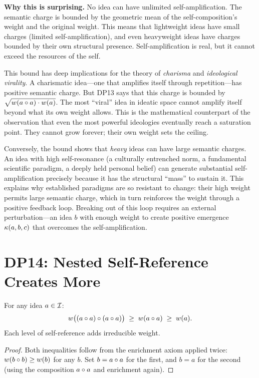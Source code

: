 \begin{surprisebox}
\textbf{Why this is surprising.} No idea can have unlimited
self-amplification. The semantic charge is bounded by the geometric mean
of the self-composition's weight and the original weight. This means
that lightweight ideas have small charges (limited self-amplification),
and even heavyweight ideas have charges bounded by their own structural
presence. Self-amplification is real, but it cannot exceed the resources
of the self.
\end{surprisebox}

This bound has deep implications for the theory of \emph{charisma} and
\emph{ideological virality}. A charismatic idea---one that amplifies
itself through repetition---has positive semantic charge. But DP13 says
that this charge is bounded by $\sqrt{w(a \circ a) \cdot w(a)}$.
The most ``viral'' idea in ideatic space cannot amplify itself beyond
what its own weight allows. This is the mathematical counterpart of
the observation that even the most powerful ideologies eventually
reach a saturation point. They cannot grow forever; their own weight
sets the ceiling.

Conversely, the bound shows that \emph{heavy} ideas can have large
semantic charges. An idea with high self-resonance (a culturally
entrenched norm, a fundamental scientific paradigm, a deeply held
personal belief) can generate substantial self-amplification precisely
because it has the structural ``mass'' to sustain it. This explains why
established paradigms are so resistant to change: their high weight
permits large semantic charge, which in turn reinforces the weight
through a positive feedback loop. Breaking out of this loop requires an
external perturbation---an idea $b$ with enough weight to create
positive emergence $\kappa(a, b, c)$ that overcomes the
self-amplification.

\section{DP14: Nested Self-Reference Creates More}

\begin{theorem}
\label{thm:nested-self-reference}
For any idea $a \in \mathcal{I}$:
\[
w\bigl((a \circ a) \circ (a \circ a)\bigr) \;\geq\;
w(a \circ a) \;\geq\; w(a).
\]
Each level of self-reference adds irreducible weight.
\end{theorem}

\begin{proof}
Both inequalities follow from the enrichment axiom applied twice:
$w(b \circ b) \geq w(b)$ for any $b$. Set $b = a \circ a$ for
the first, and $b = a$ for the second (using the composition
$a \circ a$ and enrichment again).
\end{proof}

